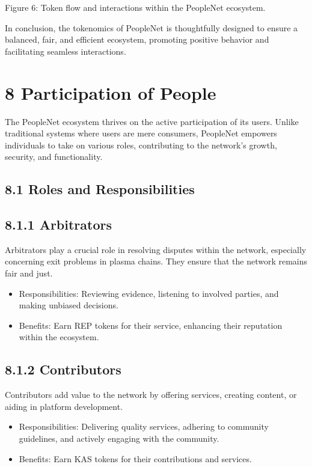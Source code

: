 \documentclass[10pt]{article}
\begin{document}
Figure 6: Token flow and interactions within the PeopleNet ecosystem.

In conclusion, the tokenomics of PeopleNet is thoughtfully designed to ensure a balanced, fair, and efficient ecosystem, promoting positive behavior and facilitating seamless interactions.

\section*{8 Participation of People}
The PeopleNet ecosystem thrives on the active participation of its users. Unlike traditional systems where users are mere consumers, PeopleNet empowers individuals to take on various roles, contributing to the network's growth, security, and functionality.

\subsection*{8.1 Roles and Responsibilities}
\subsection*{8.1.1 Arbitrators}
Arbitrators play a crucial role in resolving disputes within the network, especially concerning exit problems in plasma chains. They ensure that the network remains fair and just.

\begin{itemize}
  \item Responsibilities: Reviewing evidence, listening to involved parties, and making unbiased decisions.
  \item Benefits: Earn REP tokens for their service, enhancing their reputation within the ecosystem.
\end{itemize}

\subsection*{8.1.2 Contributors}
Contributors add value to the network by offering services, creating content, or aiding in platform development.

\begin{itemize}
  \item Responsibilities: Delivering quality services, adhering to community guidelines, and actively engaging with the community.
  \item Benefits: Earn KAS tokens for their contributions and services.
\end{itemize}
\end{document}
